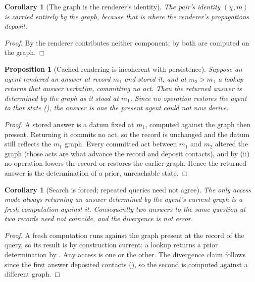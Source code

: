 \documentclass[11pt,a4paper]{article}
\theoremstyle{clstyle}
\newtheorem{proposition}[theorem]{Proposition}
\newtheorem{corollary}[theorem]{Corollary}
\theoremstyle{definition}
\theoremstyle{remark}
\newcommand{\Char}{\chi}
\newcommand{\rec}{m}
\begin{document}
\begin{corollary}[The graph is the renderer's identity]
\label{cor:graph-identity}
The pair's identity $(\Char,\rec)$ is carried entirely by the graph, because
that is where the renderer's propagations deposit.
\end{corollary}

\begin{proof}
By  the renderer contributes neither component; by
 both are computed on the graph.
\end{proof}

\begin{proposition}[Cached rendering is incoherent with persistence]
\label{prop:no-cache}
Suppose an agent rendered an answer at record $\rec_1$ and stored it, and at
$\rec_2>\rec_1$ a lookup returns that answer verbatim, committing no act.
Then the returned answer is determined by the graph as it stood at $\rec_1$.
Since no operation restores the agent to that state (),
the answer is one the present agent could not now derive.
\end{proposition}

\begin{proof}
A stored answer is a datum fixed at $\rec_1$, computed against the graph then
present. Returning it commits no act, so the record is unchanged and the
datum still reflects the $\rec_1$ graph. Every committed act between $\rec_1$
and $\rec_2$ altered the graph (those acts are what advance the record and
deposit contacts), and by (ii) no operation lowers the
record or restores the earlier graph. Hence the returned answer is the
determination of a prior, unreachable state.
\end{proof}

\begin{corollary}[Search is forced; repeated queries need not agree]
\label{cor:no-staleness}
The only access mode always returning an answer determined by the agent's
\emph{current} graph is a fresh computation against it. Consequently two
answers to the same question at two records need not coincide, and the
divergence is not error.
\end{corollary}

\begin{proof}
A fresh computation runs against the graph present at the record of the
query, so its result is by construction current; a lookup returns a prior
determination by . Any access is one or the other. The
divergence claim follows since the first answer deposited contacts
(), so the second is computed against a different graph.
\end{proof}
\end{document}

